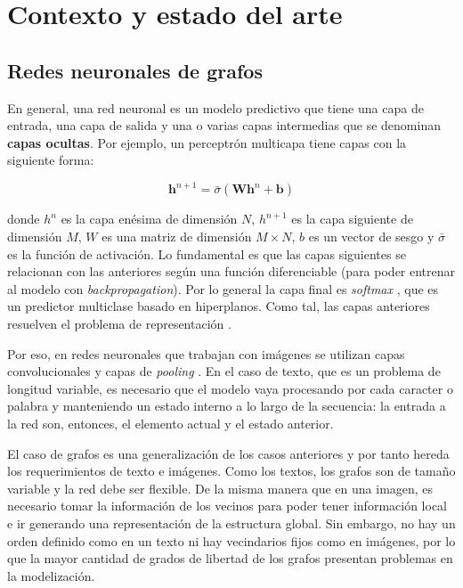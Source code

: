 \documentclass[
    left=2.0cm,         %
    right=2.0cm,        %
    top=2.0cm,          %
    bottom=2.5cm,         %
    bindingoffset=6mm,  %
    nohyphenation=false %
]{eiti/eiti-thesis}
\begin{document}
\section{Contexto y estado del arte}
\subsection{Redes neuronales de grafos}

En general, una red neuronal es un modelo predictivo que tiene una capa de entrada, %
una capa de salida y una o varias capas intermedias que se denominan \textbf{capas
ocultas}. Por ejemplo, un perceptrón multicapa tiene capas con la siguiente forma:

\begingroup
 $$\mathbf{h}^{n+1} = \bar{\sigma}(\mathbf{W h}^{n} + \mathbf{b})$$
\endgroup


donde $h^n$ es la capa enésima de dimensión $N$, $h^{n+1}$ es la capa siguiente de
dimensión $M$, $W$ es una matriz de dimensión $M\times N$, $b$ es un vector de
sesgo y $\bar\sigma$ es la función de activación. Lo fundamental es que las
capas siguientes se relacionan con las anteriores según una función diferenciable
(para poder entrenar al modelo con \textit{backpropagation}). Por lo general la
capa final es \textit{softmax} \cite{sfunsupervised}, que es un predictor 
multiclase basado en hiperplanos. Como tal, las capas anteriores 
resuelven el problema de representación \cite{nielsen2015neural}.

Por eso, en redes neuronales que trabajan con imágenes se utilizan capas convolucionales 
y capas de \textit{pooling} \cite{alexnet}. En el caso de texto, que es un problema de
longitud variable,
es necesario que el modelo vaya procesando por cada caracter o palabra y manteniendo
un estado interno a lo largo de la secuencia: la entrada a la red son, entonces,
el elemento actual y el estado anterior. %




El caso de grafos es una generalización de los casos anteriores y por tanto hereda
los requerimientos de texto e imágenes. Como los textos, los grafos son de tamaño
variable y la red debe ser flexible. %
De la misma manera que en una imagen, es necesario tomar la información de los
vecinos para poder tener información local e ir generando una representación
de la estructura global. Sin embargo, no hay un orden definido como en un texto
ni hay vecindarios fijos como en imágenes, por lo que la mayor cantidad de grados
de libertad de los grafos presentan problemas en la modelización.
\end{document}
